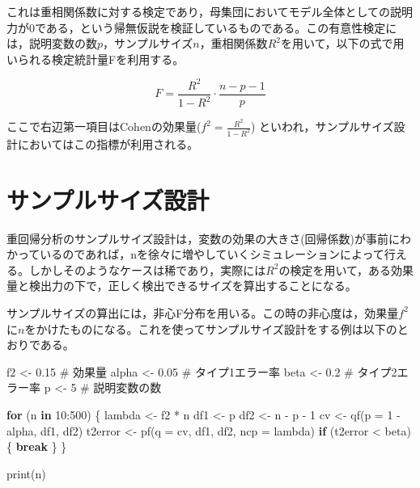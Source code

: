 \documentclass[
  a4paper,
]{ltjsbook}
\newenvironment{Shaded}{\begin{snugshade}}{\end{snugshade}}
\newcommand{\AttributeTok}[1]{\textcolor[rgb]{0.40,0.45,0.13}{#1}}
\newcommand{\CommentTok}[1]{\textcolor[rgb]{0.37,0.37,0.37}{#1}}
\newcommand{\ControlFlowTok}[1]{\textcolor[rgb]{0.00,0.23,0.31}{\textbf{#1}}}
\newcommand{\DecValTok}[1]{\textcolor[rgb]{0.68,0.00,0.00}{#1}}
\newcommand{\FloatTok}[1]{\textcolor[rgb]{0.68,0.00,0.00}{#1}}
\newcommand{\FunctionTok}[1]{\textcolor[rgb]{0.28,0.35,0.67}{#1}}
\newcommand{\NormalTok}[1]{\textcolor[rgb]{0.00,0.23,0.31}{#1}}
\newcommand{\OtherTok}[1]{\textcolor[rgb]{0.00,0.23,0.31}{#1}}
\newcommand{\SpecialCharTok}[1]{\textcolor[rgb]{0.37,0.37,0.37}{#1}}
\begin{document}
これは重相関係数に対する検定であり，母集団においてモデル全体としての説明力が0である，という帰無仮説を検証しているものである。この有意性検定には，説明変数の数\(p\)，サンプルサイズ\(n\)，重相関係数\(R^2\)を用いて，以下の式で用いられる検定統計量Fを利用する\autocite{Haebara2014}。

\[ F= \frac{R^2}{1-R^2}\cdot\frac{n-p-1}{p} \]

ここで右辺第一項目はCohenの効果量(\(f^2=\frac{R^2}{1-R^2}\))
といわれ，サンプルサイズ設計においてはこの指標が利用される。

\section{サンプルサイズ設計}\label{ux30b5ux30f3ux30d7ux30ebux30b5ux30a4ux30baux8a2dux8a08-1}

重回帰分析のサンプルサイズ設計は，変数の効果の大きさ(回帰係数)が事前にわかっているのであれば，nを徐々に増やしていくシミュレーションによって行える。しかしそのようなケースは稀であり，実際には\(R^2\)の検定を用いて，ある効果量と検出力の下で，正しく検出できるサイズを算出することになる。

サンプルサイズの算出には，非心F分布を用いる。この時の非心度は，効果量\(f^2\)に\(n\)をかけたものになる。これを使ってサンプルサイズ設計をする例は以下のとおりである。

\begin{Shaded}
\begin{Highlighting}[]
\NormalTok{f2 }\OtherTok{\textless{}{-}} \FloatTok{0.15} \CommentTok{\# 効果量}
\NormalTok{alpha }\OtherTok{\textless{}{-}} \FloatTok{0.05} \CommentTok{\# タイプ1エラー率}
\NormalTok{beta }\OtherTok{\textless{}{-}} \FloatTok{0.2} \CommentTok{\# タイプ2エラー率}
\NormalTok{p }\OtherTok{\textless{}{-}} \DecValTok{5} \CommentTok{\# 説明変数の数}

\ControlFlowTok{for}\NormalTok{ (n }\ControlFlowTok{in} \DecValTok{10}\SpecialCharTok{:}\DecValTok{500}\NormalTok{) \{}
\NormalTok{  lambda }\OtherTok{\textless{}{-}}\NormalTok{ f2 }\SpecialCharTok{*}\NormalTok{ n}
\NormalTok{  df1 }\OtherTok{\textless{}{-}}\NormalTok{ p}
\NormalTok{  df2 }\OtherTok{\textless{}{-}}\NormalTok{ n }\SpecialCharTok{{-}}\NormalTok{ p }\SpecialCharTok{{-}} \DecValTok{1}
\NormalTok{  cv }\OtherTok{\textless{}{-}} \FunctionTok{qf}\NormalTok{(}\AttributeTok{p =} \DecValTok{1} \SpecialCharTok{{-}}\NormalTok{ alpha, df1, df2)}
\NormalTok{  t2error }\OtherTok{\textless{}{-}} \FunctionTok{pf}\NormalTok{(}\AttributeTok{q =}\NormalTok{ cv, df1, df2, }\AttributeTok{ncp =}\NormalTok{ lambda)}
  \ControlFlowTok{if}\NormalTok{ (t2error }\SpecialCharTok{\textless{}}\NormalTok{ beta) \{}
    \ControlFlowTok{break}
\NormalTok{  \}}
\NormalTok{\}}

\FunctionTok{print}\NormalTok{(n)}
\end{Highlighting}
\end{Shaded}
\end{document}
